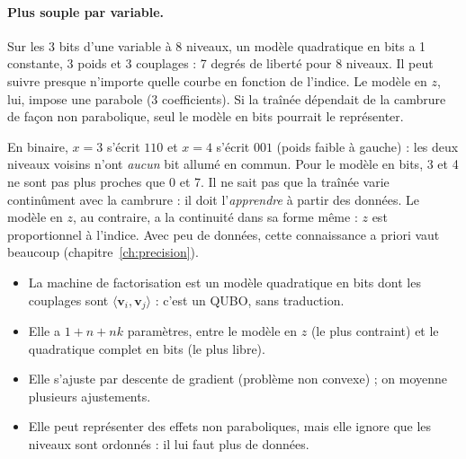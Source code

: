 \paragraph{Plus souple par variable.} Sur les 3 bits d'une variable à 8 niveaux, un modèle quadratique en bits a 1 constante, 3 poids et 3 couplages : 7 degrés de liberté pour 8 niveaux. Il peut suivre presque n'importe quelle courbe en fonction de l'indice. Le modèle en $z$, lui, impose une parabole (3 coefficients). Si la traînée dépendait de la cambrure de façon non parabolique, seul le modèle en bits pourrait le représenter.

\begin{piege}
En binaire, $x=3$ s'écrit $110$ et $x=4$ s'écrit $001$ (poids faible à gauche) : les deux niveaux voisins n'ont \emph{aucun} bit allumé en commun. Pour le modèle en bits, 3 et 4 ne sont pas plus proches que 0 et 7. Il ne sait pas que la traînée varie continûment avec la cambrure : il doit l'\emph{apprendre} à partir des données. Le modèle en $z$, au contraire, a la continuité dans sa forme même : $z$ est proportionnel à l'indice. Avec peu de données, cette connaissance a priori vaut beaucoup (chapitre~\ref{ch:precision}).
\end{piege}

\begin{resultat}
\begin{itemize}
\item La machine de factorisation est un modèle quadratique en bits dont les couplages sont $\langle\mathbf v_i,\mathbf v_j\rangle$ : c'est un QUBO, sans traduction.
\item Elle a $1+n+nk$ paramètres, entre le modèle en $z$ (le plus contraint) et le quadratique complet en bits (le plus libre).
\item Elle s'ajuste par descente de gradient (problème non convexe) ; on moyenne plusieurs ajustements.
\item Elle peut représenter des effets non paraboliques, mais elle ignore que les niveaux sont ordonnés : il lui faut plus de données.
\end{itemize}
\end{resultat}


